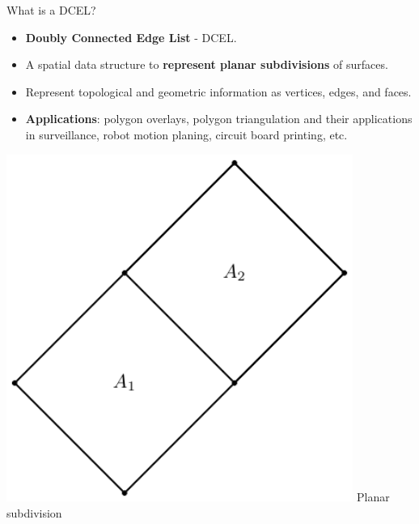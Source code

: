 \documentclass{beamer}
\begin{document}
    \begin{frame}{What is a DCEL?}
        \begin{minipage}{0.65\textwidth}
        \begin{itemize}
            \item \textbf{Doubly Connected Edge List} - DCEL.
            \item A spatial data structure to \textbf{represent planar subdivisions} of surfaces.
            \item Represent topological and geometric information as vertices, edges, and faces.
            \item \textbf{Applications}: polygon overlays, polygon triangulation and their applications in surveillance, robot motion planing, circuit board printing, etc.
        \end{itemize}
        \end{minipage}\hfill %
        \begin{minipage}{0.34\textwidth}
            \centering
            \includegraphics[width=0.85\textwidth]{figures/planar_subdivision}
            \tiny{Planar subdivision} \\
            \vspace{0.25cm}

\end{minipage}
\end{frame}
\end{document}

